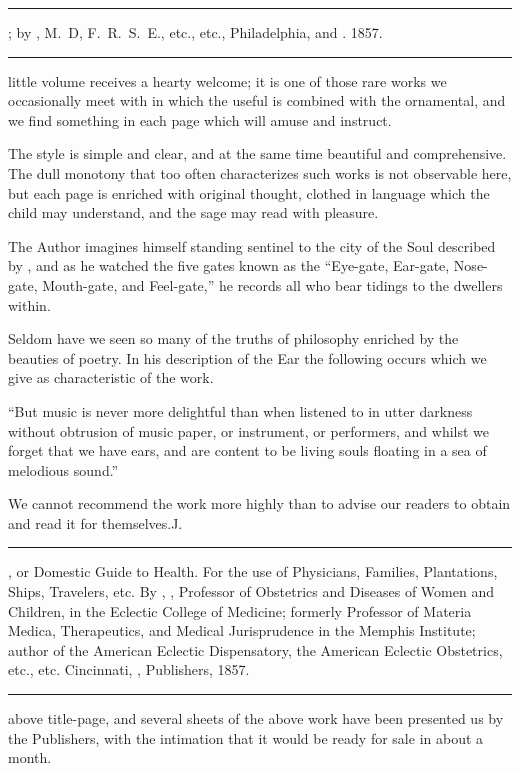 
\fancybreak{* * *}
\footnotesize
{}; by , M.~D, F.~R.~S.~E., etc., etc.,
Philadelphia,  and . 1857.
\plainbreak{1}
\normalsize

 little volume receives a hearty welcome; it is one of those rare
works we occasionally meet with in which the useful is combined
with the ornamental, and we find something in each page which will
amuse and instruct.

The style is simple and clear, and at the same time beautiful and
comprehensive. The dull monotony that too often characterizes such
works is not observable here, but each page is enriched with original
thought, clothed in language which the child may understand, and the
sage may read with pleasure.

The Author imagines himself standing sentinel to the city of the Soul
described by , and as he watched the five gates known
as the ``Eye-gate, Ear-gate, Nose-gate, Mouth-gate, and Feel-gate,'' he
records all who bear tidings to the dwellers within.

Seldom have we seen so many of the truths of philosophy enriched
by the beauties of poetry. In his description of the Ear the following
occurs which we give as characteristic of the work.

``But music is never more delightful than when listened to in utter
darkness without obtrusion of music paper, or instrument, or performers,
and whilst we forget that we have ears, and are content to be living
souls floating in a sea of melodious sound.''

We cannot recommend the work more highly than to advise our readers
to obtain and read it for themselves.\hfill{}J.\quad{}

\fancybreak{* * *}
\footnotesize
{}, or Domestic Guide to Health. For the use of Physicians,
Families, Plantations, Ships, Travelers, etc. By , \md, Professor of
Obstetrics and Diseases of Women and Children, in the Eclectic College of Medicine;
formerly Professor of Materia Medica, Therapeutics, and Medical Jurisprudence in the
Memphis Institute; author of the American Eclectic Dispensatory, the American
Eclectic Obstetrics, etc., etc. Cincinnati, , Publishers, 1857.
\plainbreak{1}
\normalsize

 above title-page, and several sheets of the above work have
been presented us by the Publishers, with the intimation that it would
be ready for sale in about a month.

